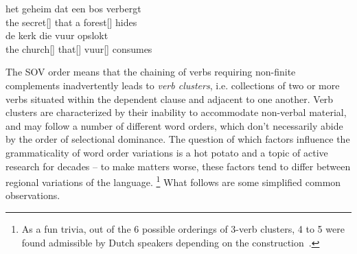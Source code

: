 \begin{exe}
\ex\label{gloss:rc_ambiguity}
\begin{xlist}
\ex
\gll het geheim dat een bos verbergt\\
the secret[] that a forest[] hides\\
\ex
\gll de kerk die vuur opslokt\\
the church[] that[] vuur[] consumes\\
\end{xlist}
\end{exe}

The SOV order means that the chaining of verbs requiring non-finite complements inadvertently leads to \textit{verb clusters}, i.e. collections of two or more verbs situated within the dependent clause and adjacent to one another.
Verb clusters are characterized by their inability to accommodate non-verbal material, and may follow a number of different word orders, which don't necessarily abide by the order of selectional dominance.
The question of which factors influence the grammaticality of word order variations  is a hot potato and a topic of active research for decades -- to make matters worse, these factors tend to differ between regional variations of the language.%
	\footnote{As a fun trivia,  out of the 6 possible orderings of 3-verb clusters, 4 to 5 were found admissible by Dutch speakers depending on the construction~\cite{3vc}.}
What follows are some simplified common observations.

